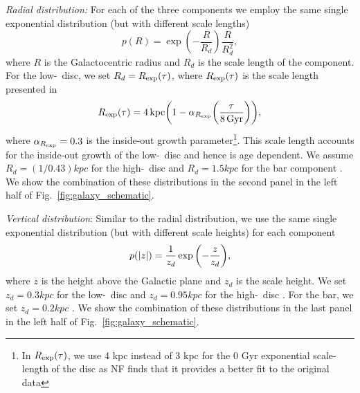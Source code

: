 \textit{Radial distribution:} For each of the three components we employ the same single exponential distribution (but with different scale lengths)
\begin{equation}\label{eq:galaxy_R}
    p(R) = \exp(-\frac{R}{R_d}) \frac{R}{R_d^2},
\end{equation}
where $R$ is the Galactocentric radius and $R_d$ is the scale length of the component. For the low-\achem~disc, we set $R_d = R_{\rm exp}(\tau)$, where $R_{\rm exp}(\tau)$ is the scale length presented in \citet[][Eq.~5]{Frankel+2018}
\begin{equation}
    R_{\rm exp}(\tau) = 4 \unit{kpc} \qty(1 - \alpha_{R_{\rm exp}} \qty(\frac{\tau}{8 \unit{Gyr}})),
\end{equation}
where $\alpha_{R_{\rm exp}} = 0.3$ is the inside-out growth parameter\footnote{In $R_{\rm exp}(\tau)$, we use 4 kpc instead of 3 kpc for the 0 Gyr exponential scale-length of the disc as NF finds that it provides a better fit to the original data}. This scale length accounts for the inside-out growth of the low-\achem~disc and hence is age dependent. We assume $R_d = (1 / 0.43) \unit{kpc}$ for the high-\achem~disc \citep[][Table~1]{Bovy+2016} and $R_d = 1.5 \unit{kpc}$ for the bar component \citep{Bovy+2019}. We show the combination of these distributions in the second panel in the left half of Fig.~\ref{fig:galaxy_schematic}.

\textit{Vertical distribution}: Similar to the radial distribution, we use the same single exponential distribution (but with different scale heights) for each component
\begin{equation}\label{eq:galaxy_z}
    p(\abs{z}) = \frac{1}{z_d} \exp\qty(-\frac{z}{z_d}),
\end{equation}
where $z$ is the height above the Galactic plane and $z_d$ is the scale height. We set $z_d = 0.3 \unit{kpc}$ for the low-\achem~disc \citep{McMillan+2011} and $z_d = 0.95 \unit{kpc}$ for the high-\achem~disc \citep{Bovy+2016}. 
For the bar, we set $z_d = 0.2 \unit{kpc}$ \citep{Wegg+15}. We show the combination of these distributions in the last panel in the left half of Fig.~\ref{fig:galaxy_schematic}.

